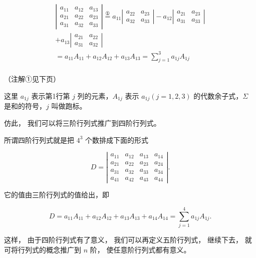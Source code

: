 \[
\begin{array}{l} \left| \begin{array}{lll} a _ {11} & a _ {12} & a _ {13} \\ a _ {21} & a _ {22} & a _ {23} \\ a _ {31} & a _ {32} & a _ {33} \end{array} \right| \stackrel {①} {=} a _ {11} \left| \begin{array}{ll} a _ {22} & a _ {23} \\ a _ {32} & a _ {33} \end{array} \right| - a _ {12} \left| \begin{array}{ll} a _ {21} & a _ {23} \\ a _ {31} & a _ {33} \end{array} \right| \\ + a _ {13} \left| \begin{array}{ll} a _ {21} & a _ {22} \\ a _ {31} & a _ {32} \end{array} \right| \\ = a _ {11} A _ {11} + a _ {12} A _ {12} + a _ {13} A _ {13} = \sum_ {j = 1} ^ {3} a _ {1 j} A _ {1 j} \\ \end{array}
\]

（注解①见下页）

这里 \(a_{1j}\) 表示第1行第 \(j\) 列的元素，\(A_{1j}\) 表示
\(a_{1j}(j=1,2,3)\) 的代数余子式，\(\Sigma\) 是和的符号，\(j\)
叫做跑标。

仿此， 我们可以将三阶行列式推广到四阶行列式。

所谓四阶行列式就是把 \(4^{3}\) 个数排成下面的形式

\[
D = \left| \begin{array}{cccc} a _ {11} & a _ {12} & a _ {13} & a _ {14} \\ a _ {21} & a _ {22} & a _ {23} & a _ {24} \\ a _ {31} & a _ {32} & a _ {33} & a _ {34} \\ a _ {41} & a _ {42} & a _ {43} & a _ {44} \end{array} \right|.
\]

它的值由三阶行列式的值给出，即

\[
D = a _ {11} A _ {11} + a _ {12} A _ {12} + a _ {13} A _ {13} + a _ {14} A _ {14} = \sum_ {j = 1} ^ {4} a _ {1 j} A _ {1 j}.
\]

这样， 由于四阶行列式有了意义， 我们可以再定义五阶行列式， 继续下去，
就可将行列式的概念推广到 \(n\) 阶， 使任意阶行列式都有意义。

